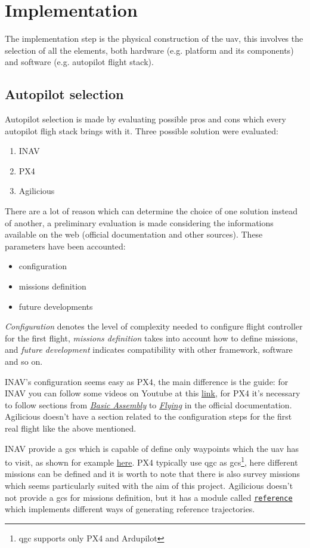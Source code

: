 \section{Implementation}
The implementation step is the physical construction of the \ac{uav}, this involves the selection of all the elements, both hardware (e.g. platform and its components) and software (e.g. autopilot flight stack).

\subsection{Autopilot selection}
Autopilot selection is made by evaluating possible pros and cons which every autopilot fligh stack brings with it. Three possible solution were evaluated:
\begin{enumerate}
	\item INAV \cite{inav}
	\item PX4 \cite{px4}
	\item Agilicious \cite{foehn2022agilicious}
\end{enumerate}
There are a lot of reason which can determine the choice of one solution instead of another, a preliminary evaluation is made considering the informations available on the web (official documentation and other sources). These parameters have been accounted:
\begin{itemize}
	\item configuration
	\item missions definition
	\item future developments
\end{itemize}
\textit{Configuration} denotes the level of complexity needed to configure flight controller for the first flight, \textit{missions definition} takes into account how to define missions, and \textit{future development} indicates compatibility with other framework, software and so on.

INAV's configuration seems easy as PX4, the main difference is the guide: for INAV you can follow some videos on Youtube at this \href{https://www.youtube.com/playlist?list=PLOUQ8o2_nCLkfcKsWobDLtBNIBzwlwRC8}{link}, for PX4 it's necessary to follow sections from \href{https://docs.px4.io/main/en/assembly/}{\textit{Basic Assembly}} to \href{https://docs.px4.io/main/en/flying/}{\textit{Flying}} in the official documentation.
Agilicious doesn't have a section related to the configuration steps for the first real flight like the above mentioned.

INAV provide a \ac{gcs} which is capable of define only waypoints which the \ac{uav} has to visit, as shown for example \href{https://www.youtube.com/watch?v=J6UBai-OIYQ}{here}. PX4 typically use \ac{qgc} as \ac{gcs}\footnote{\ac{qgc} supports only PX4 and Ardupilot}, here different missions can be defined and it is worth to note that there is also survey missions which seems particularly suited with the aim of this project. Agilicious doesn't not provide a \ac{gcs} for missions definition, but it has a module called \href{https://agilicious.readthedocs.io/en/main/modules/references.html}{\texttt{reference}} which implements different ways of generating reference trajectories.

